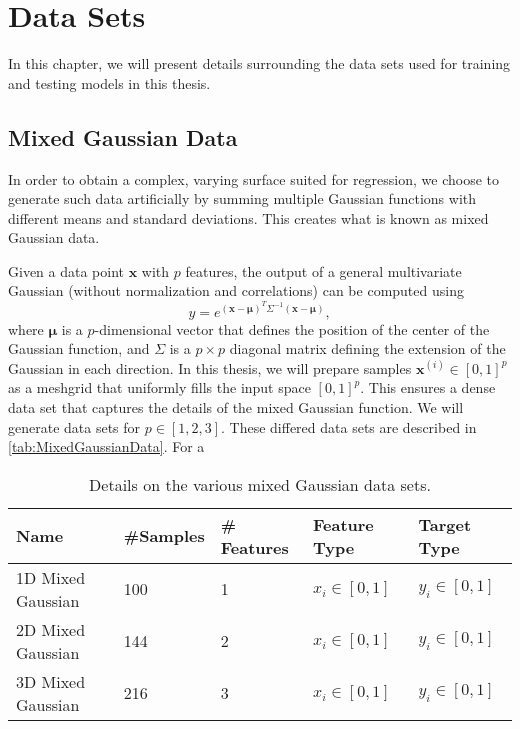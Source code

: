 \chapter{Data Sets}\label{sec:Appendix B}
In this chapter, we will present details surrounding the data sets used for training and testing models in this thesis. 

\section{Mixed Gaussian Data}\label{sec:Mixed Gaussian Data}
In order to obtain a complex, varying surface suited for regression, we choose to generate such data artificially by summing multiple Gaussian functions with different means and standard deviations. This creates what is known as mixed Gaussian data. 

Given a data point $\boldsymbol{x}$ with $p$ features, the output of a general multivariate Gaussian (without normalization and correlations) can be computed using 
\begin{equation}\label{eq:Gaussian}
    y = e^{(\boldsymbol{x} - \boldsymbol{\mu})^T \Sigma^{-1}(\boldsymbol{x} - \boldsymbol{\mu})},
\end{equation}
where $\boldsymbol{\mu}$ is a $p$-dimensional vector that defines the position of the center of the Gaussian function, and $\Sigma$ is a $p\times p$ diagonal matrix defining the extension of the Gaussian in each direction. In this thesis, we will prepare samples $\boldsymbol{x}^{(i)} \in [0,1]^p$ as a meshgrid that uniformly fills the input space $[0,1]^p$. This ensures a dense data set that captures the details of the mixed Gaussian function. We will generate data sets for $p \in[1,2,3].$ These differed data sets are described in \autoref{tab:MixedGaussianData}. For a 

\begin{table}[]\label{tab:MixedGaussianData}
\begin{tabular}{|l|l|l|l|l|}
\hline
 Name& \#Samples&  \# Features& Feature Type& Target Type \\ \hline
 1D Mixed Gaussian&  100&  1& $x_i \in [0,1]$ & $y_i \in [0,1]$  \\ \hline
 2D Mixed Gaussian&  144&  2& $x_i \in [0,1]$ & $y_i \in [0,1]$ \\ \hline
 3D Mixed Gaussian&  216&  3& $x_i \in [0,1]$ & $y_i \in [0,1]$ \\ \hline
\end{tabular}
\caption{Details on the various mixed Gaussian data sets.}
\end{table}









